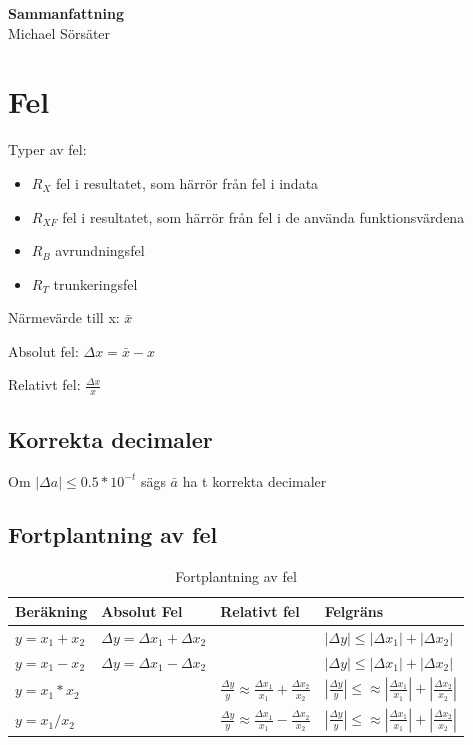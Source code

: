 \documentclass[12pt,a4paper]{article}
\begin{document}
\begin{center}
	\Huge
	\textbf{Sammanfattning}
	\\
	\large
	Michael Sörsäter
\end{center}

\large
\section{Fel}
Typer av fel:
\begin{itemize}
\item{$R_X$ fel i resultatet, som härrör från fel i indata}
\item{$R_{XF}$ fel i resultatet, som härrör från fel i de använda funktionsvärdena}
\item{$R_B$ avrundningsfel}
\item{$R_T$ trunkeringsfel}
\end{itemize}

Närmevärde till x: $\bar{x}$

Absolut fel: $\Delta x = \bar{x}-x$

Relativt fel: $ \frac{\Delta x}{x}$

\subsection{Korrekta decimaler} \label{korrekta}
Om $|\Delta a| \leq 0.5*10^{-t}$ sägs $\bar{a}$ ha t korrekta decimaler

\subsection{Fortplantning av fel}
\begin{table}[H]
	\Large
  \centering
  \begin{tabular}{| l | l | l | l |}
  	\hline
  	Beräkning & Absolut Fel & Relativt fel & Felgräns \\ \hline
  	$ y = x_1 + x_2 $ &
  	$\Delta y = \Delta x_1 + \Delta x_2 $ &
  	&
  	$| \Delta y| \leq |\Delta x_1| + |\Delta x_2|$ \\ \hline

	$ y = x_1 - x_2 $ &
	$ \Delta y = \Delta x_1 - \Delta x_2 $ &
	&
	$| \Delta y| \leq |\Delta x_1| + |\Delta x_2|$\\ \hline

  	$ y = x_1 * x_2 $ &
  	&
  	$ \frac{\Delta y}{y} \approx \frac{\Delta x_1}{x_1} + \frac{\Delta x_2}{x_2} $ &
  	$| \frac{\Delta y}{y} | \leq \approx | \frac{\Delta x_1}{x_1} | + | \frac{\Delta x_2}{x_2} |$ \\ [10pt]\hline

	$ y = x_1 / x_2 $ &
	&
	$ \frac{\Delta y}{y} \approx \frac{\Delta x_1}{x_1} - \frac{\Delta x_2}{x_2} $ &
	$| \frac{\Delta y}{y} | \leq \approx | \frac{\Delta x_1}{x_1} | + | \frac{\Delta x_2}{x_2} |$ \\ [10pt]\hline

  \end{tabular}
  \caption{Fortplantning av fel}
\end{table}
\end{document}
